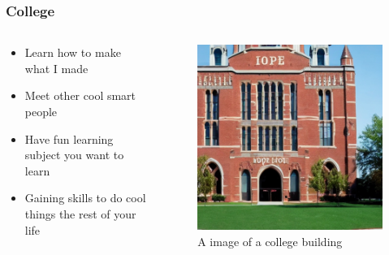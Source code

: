 \documentclass[
	11pt,
	t,
]{beamer}
\begin{document}
\begin{frame}
	\frametitle{College}
	\begin{columns}
	  \begin{column}{0.7\textwidth}
		\begin{itemize}
		  \item Learn how to make what I made \\
		  \item Meet other cool smart people \\
		  \item Have fun learning subject you want to learn \\
		  \item Gaining skills to do cool things the rest of your life \\
		\end{itemize}
	  \end{column}
	  \begin{column}{0.3\textwidth}
		\begin{center}
		  \begin{figure}
			\includegraphics[scale=0.17]{3.jpg}
			\caption{A image of a college building}
		  \end{figure}
		\end{center}
	  \end{column}
	\end{columns}
\end{frame}
\end{document}

